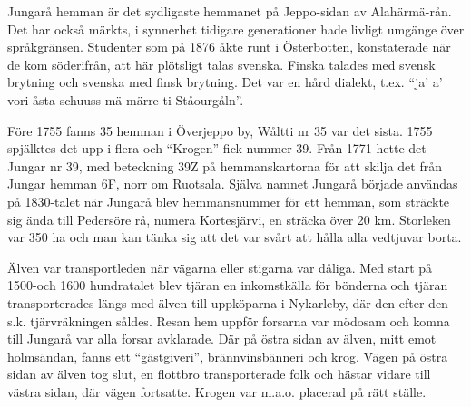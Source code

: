 
Jungarå hemman är det sydligaste hemmanet på Jeppo-sidan av Alahärmä-rån. Det har också märkts, i synnerhet tidigare generationer hade livligt umgänge över språkgränsen. Studenter som på 1876 åkte runt i Österbotten, konstaterade när de kom söderifrån, att här plötsligt talas svenska. Finska talades med svensk brytning och svenska med finsk brytning. Det var en hård dialekt, t.ex. ``ja’ a’ vori åsta schuuss mä märre ti Ståourgåln''.

Före 1755 fanns 35 hemman i Överjeppo by, Wåltti nr 35 var det sista. 1755 spjälktes det upp i flera och ``Krogen'' fick nummer 39. Från 1771 hette det Jungar nr 39, med beteckning 39Z på hemmanskartorna för att skilja det från Jungar hemman 6F, norr om Ruotsala. Själva namnet Jungarå började användas på 1830-talet när Jungarå blev hemmansnummer för ett hemman, som sträckte sig ända till Pedersöre rå, numera Kortesjärvi, en sträcka över 20 km. Storleken var 350 ha och man kan tänka sig att det var svårt att hålla alla vedtjuvar borta.

Älven var transportleden när vägarna eller stigarna var dåliga. Med start på 1500-och 1600 hundratalet blev tjäran en inkomstkälla för bönderna och tjäran transporterades längs med älven till uppköparna i Nykarleby, där den efter den s.k. tjärvräkningen såldes. Resan hem uppför forsarna var mödosam och komna till Jungarå var alla forsar avklarade. Där på östra sidan av älven, mitt emot holmsändan, fanns ett ``gästgiveri'', brännvinsbänneri och krog. Vägen på östra sidan av älven tog slut, en flottbro transporterade folk och hästar vidare till västra sidan, där vägen fortsatte. Krogen var m.a.o. placerad på rätt ställe.

